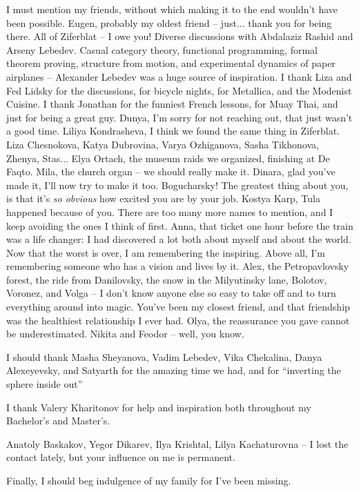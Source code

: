 I must mention my friends, without which making it to the end wouldn't have
been possible. Eugen, probably my oldest friend -- just... thank you for being
there. All of Ziferblat -- I owe you! Diverse discussions with Abdalaziz Rashid
and Arseny Lebedev. Casual category theory, functional programming, formal
theorem proving, structure from motion, and experimental dynamics of paper
airplanes -- Alexander Lebedev was a huge source of inspiration. I thank Liza
and Fed Lidsky for the discussions, for bicycle nights, for Metallica, and the
Modenist Cuisine. I thank Jonathan for the funniest French lessons, for Muay
Thai, and just for being a great guy. Dunya, I'm sorry for not reaching out,
that just wasn't a good time. Liliya Kondrasheva, I think we found the same thing
in Ziferblat. Liza Chesnokova, Katya Dubrovina, Varya Ozhiganova, Sasha
Tikhonova, Zhenya, Stas... Elya Ortach, the museum raids we organized, finishing
at De Faqto. Mila, the church organ -- we should really make it. Dinara, glad
you've made it, I'll now try to make it too. Bogucharsky! The greatest thing
about you, is that it's \emph{so obvious} how excited you are by your job.
Kostya Karp, Tula happened because of you. There are too many more names to
mention, and I keep avoiding the ones I think of first. Anna, that ticket one
hour before the train was a life changer: I had discovered a lot both about
myself and about the world. Now that the worst is over, I am remembering the
inspiring. Above all, I'm remembering someone who has a vision and lives by it.
Alex, the Petropavlovsky forest, the ride from Danilovsky, the snow in the
Milyutinsky lane, Bolotov, Voronez, and Volga -- I don't know anyone else so
easy to take off and to turn everything around into magic. You've been my
closest friend, and that friendship was the healthiest relationship I ever had.
Olya, the reassurance you gave cannot be underestimated.
Nikita and Feodor -- well, you know.

I should thank Masha Sheyanova, Vadim Lebedev, Vika Chekalina, Danya
Alexeyevsky, and Satyarth for the amazing time we had, and for ``inverting the
sphere inside out''

I thank Valery Kharitonov for help and inspiration both throughout my
Bachelor's and Master's.

Anatoly Baskakov, Yegor Dikarev, Ilya Krishtal, Lilya Kachaturovna -- I lost
the contact lately, but your influence on me is permanent.

Finally, I should beg indulgence of my family for I've been missing.
